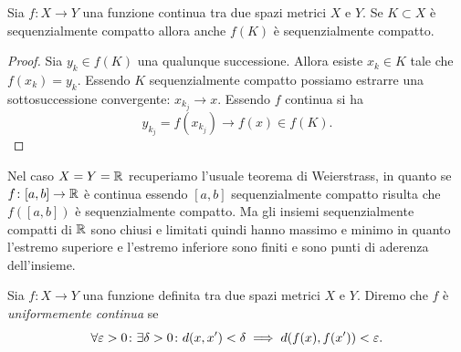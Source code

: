\begin{theorem}
  \label{th:weiestrass_metrico}%
Sia $f\colon X \to Y$ una funzione continua tra
due spazi metrici $X$ e $Y$.
Se $K\subset X$ è sequenzialmente compatto allora
anche $f(K)$ è sequenzialmente compatto.
\end{theorem}
%
\begin{proof}
Sia $y_k \in f(K)$ una qualunque successione. Allora
esiste $x_k \in K$ tale che $f(x_k) = y_k$.
Essendo $K$ sequenzialmente compatto possiamo estrarre una sottosuccessione convergente: $x_{k_j}\to x$. 
Essendo $f$ continua si ha
\[
  y_{k_j} = f(x_{k_j}) \to f(x) \in f(K).
\]
\end{proof}

Nel caso $X=Y={\mathbb R}$ recuperiamo l'usuale teorema di Weierstrass, 
in quanto se $f\colon [a,b]\to {\mathbb R}$ è continua essendo $[a,b]$ sequenzialmente compatto 
risulta che $f([a,b])$ è sequenzialmente compatto. 
Ma gli insiemi sequenzialmente compatti di ${\mathbb R}$ sono chiusi e limitati 
quindi hanno 
massimo e minimo in quanto l'estremo superiore e l'estremo inferiore 
sono finiti e sono punti di aderenza dell'insieme.

\begin{definition}
  Sia $f\colon X \to Y$ una funzione definita tra due spazi metrici $X$ e $Y$.
  Diremo che $f$ è \emph{uniformemente continua}%
 se 
  \[
  \forall \varepsilon>0 \colon \exists \delta>0 \colon 
    d(x,x')< \delta \implies d(f(x),f(x'))<\varepsilon. 
  \]
\end{definition}

